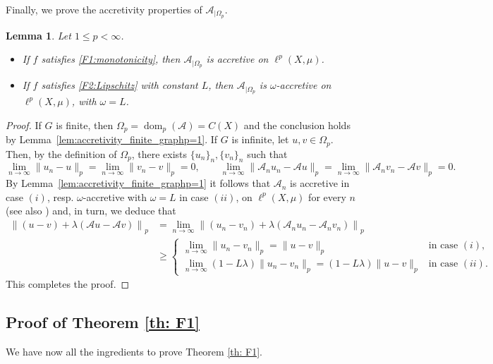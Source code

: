 \documentclass[journal]{article}
\theoremstyle{nonitalic}
\theoremstyle{nonitalic}
\theoremstyle{plain} %
\newtheorem{lemma}[theorem]{Lemma}
\numberwithin{equation}{section}
\newcommand{\dom}{\operatorname{dom}}
\newcommand{\Amin}{\mathcal{A}_{n}}
\begin{document}
Finally, we prove the accretivity properties of $\mathcal{A}_{|\Omega_p}$.

\begin{lemma}\label{lem:L_Omega_accretive}
Let $1\leq p <  \infty$. 
\begin{itemize}
\item[(i)] If     $f$ satisfies \textnormal{\ref{F1:monotonicity}}, then $\mathcal{A}_{|\Omega_p}$ is accretive on $\ell^p(X,\mu)$.
\item[(ii)] If     $f$ satisfies \textnormal{\ref{F2:Lipschitz}} with constant $L$, then $\mathcal{A}_{|\Omega_p}$ is $\omega$-accretive on $\ell^p(X,\mu)$, with $\omega = L$. 
\end{itemize}
\end{lemma}
\begin{proof}
If $G$ is finite, then $\Omega_p =  \dom_p(\mathcal{A}) = C(X)$ and the conclusion holds by Lemma~\ref{lem:accretivity_finite_graphp=1}. If $G$ is infinite, let $u,v \in \Omega_p$. Then, by the definition of $\Omega_p$, there exists $\{u_n\}_n, \{v_n\}_n$ such that 
$$
\lim_{n\to \infty}\|u_n-u\|_p=\lim_{n\to \infty}\|v_n-v\|_p=0, \qquad \lim_{n\to \infty}\|\Amin u_n-\mathcal{A}u\|_p=\lim_{n\to \infty}\|\Amin v_n-\mathcal{A}v\|_p=0.
$$
By Lemma~\ref{lem:accretivity_finite_graphp=1} it follows that $\Amin$ is accretive in case $(i)$, resp. $\omega$-accretive with $\omega = L$ in case $(ii)$, on $\ell^p(X,\mu)$ for every $n$ (see also \cite[Corollary B.4]{bianchi2022generalized}) and, in turn, we deduce  that
\begin{align*}
	\left\|(u - v) + \lambda \left(\mathcal{A}u - \mathcal{A}v\right) \right\|_p &= \lim_{n\to \infty} \left\|(u_n - v_n) + \lambda \left(\Amin u_n - \Amin v_n\right) \right\|_p\\
    &\geq \begin{cases}
	   \lim_{n\to \infty}\|u_n - v_n\|_p= \|u - v\|_p & \mbox{in case } (i),\\
       \lim_{n\to \infty} (1- L\lambda)\|u_n - v_n\|_p= (1- L\lambda)\|u - v\|_p & \mbox{in case } (ii).
	\end{cases} 
\end{align*}
This completes the proof.
\end{proof}

\subsection{Proof of Theorem \ref{th: F1}}\label{proofTh41}

We have now all the ingredients to prove Theorem \ref{th: F1}. 
\end{document}
